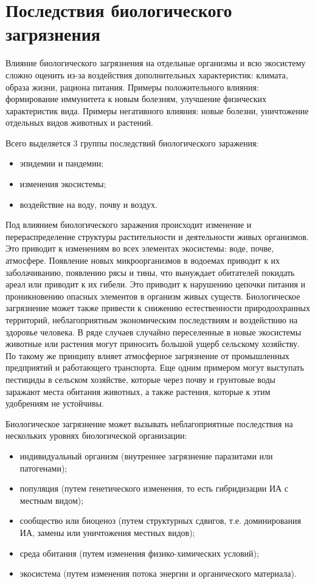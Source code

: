 \documentclass[a4paper, 12pt]{extarticle}
\begin{document}
\section{Последствия биологического загрязнения}

Влияние биологического загрязнения на отдельные организмы и всю экосистему сложно оценить из-за воздействия дополнительных характеристик: климата, образа жизни, рациона питания. Примеры положительного влияния: формирование иммунитета к новым болезням, улучшение физических характеристик вида. Примеры негативного влияния: новые болезни, уничтожение отдельных видов животных и растений.

Всего выделяется 3 группы последствий биологического заражения:
\begin{itemize}
    \item эпидемии и пандемии;
    \item изменения экосистемы;
    \item воздействие на воду, почву и воздух.
\end{itemize}

Под влиянием биологического заражения происходит изменение и перераспределение структуры растительности и деятельности живых организмов. Это приводит к изменениям во всех элементах экосистемы: воде, почве, атмосфере. Появление новых микроорганизмов в водоемах приводит к их заболачиванию, появлению рясы и тины, что вынуждает обитателей покидать ареал или приводит к их гибели. Это приводит к нарушению цепочки питания и проникновению опасных элементов в организм живых существ. Биологическое загрязнение может также привести к снижению естественности природоохранных территорий, неблагоприятным экономическим последствиям и воздействию на здоровье человека. В ряде случаев случайно переселенные в новые экосистемы животные или растения могут приносить большой ущерб сельскому хозяйству. По такому же принципу влияет атмосферное загрязнение от промышленных предприятий и работающего транспорта. Еще одним примером могут выступать пестициды в сельском хозяйстве, которые через почву и грунтовые воды заражают места обитания животных, а также растения, которые к этим удобрениям не устойчивы.

Биологическое загрязнение может вызывать неблагоприятные последствия на нескольких уровнях биологической организации:
\begin{itemize}
    \item индивидуальный организм (внутреннее загрязнение паразитами или патогенами);
    \item популяция (путем генетического изменения, то есть гибридизации ИА с местным видом);
    \item сообщество или биоценоз (путем структурных сдвигов, т.е. доминирования ИА, замены или уничтожения местных видов);
    \item среда обитания (путем изменения физико-химических условий);
    \item экосистема (путем изменения потока энергии и органического материала).
\end{itemize}
\end{document}
